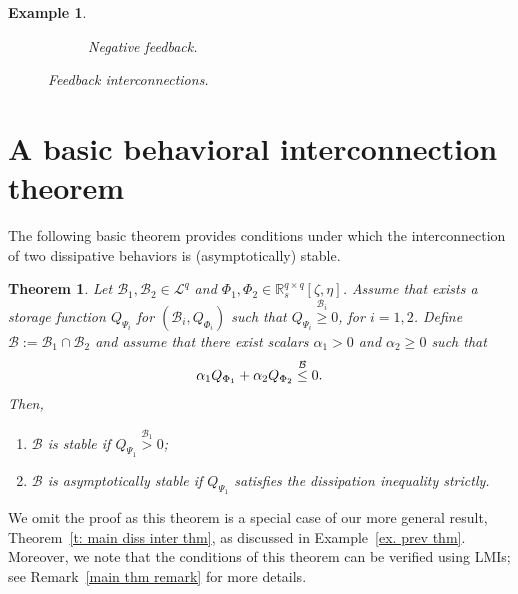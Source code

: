 \documentclass[letterpaper, 10 pt, conference]{ieeeconf}
\theoremstyle{ieeeconf}
\newtheorem{theorem}{Theorem}
\newtheorem{example}{Example}
\newcommand{\R}{\mathbb{R}}
\newcommand{\B}{\mathcal{B}}
\begin{document}
\begin{example}
\begin{figure}[H]
\begin{subfigure}[b]{0.5\linewidth}
			\caption{Negative feedback.}
			\label{fig: neg feedback}
		\end{subfigure}
		\caption{Feedback interconnections.}
		\label{fig: feedback}
	\end{figure}
	\vspace{-3ex}
	\label{ex K-inter}
\end{example}

\section{A basic behavioral interconnection theorem} 
\label{sec:first theorem}
The following basic theorem provides conditions under which the interconnection of two dissipative behaviors is (asymptotically) stable.
\begin{theorem}
	Let $\B_1,\B_2 \in \mathcal{L}^q$ and ${\Phi_1, \Phi_2 \in \R_s^{q \times q}[\zeta,\eta]}$. Assume that exists a storage function $Q_{\Psi_i}$ for $(\B_i, Q_{\Phi_i})$ such that $Q_{\Psi_i}\stackrel{\B_i}{\geq}0$, for $i=1,2$. Define $\B := \B_1 \cap \B_2$ and assume that there exist scalars $\alpha_1>0$ and $\alpha_2 \geq0$ such that
	\vspace{-0.5ex}
	\begin{equation}
		\alpha_1 Q_{\Phi_1}+\alpha_2 Q_{\Phi_2} \stackrel{\B}{\leq} 0.
		\label{diss inter thm cond}
		\vspace{-1ex}
	\end{equation}Then,
	\begin{enumerate}[label=\roman*)]
		\item $\B$ is stable if $Q_{\Psi_1}\stackrel{\B_1}{>}0$;  \label{first stat first diss inter thm}
		\item $\B$ is asymptotically stable if $Q_{\Psi_1}$ satisfies the dissipation inequality strictly. \label{second stat first diss inter thm}
	\end{enumerate}
	\label{t: first diss inter thm}
\end{theorem}
We omit the proof as this theorem is a special case of our more general result, Theorem~\ref{t: main diss inter thm}, as discussed in Example~\ref{ex. prev thm}. Moreover, we note that the conditions of this theorem can be verified using LMIs; see Remark~\ref{main thm remark} for more details.
\end{document}
